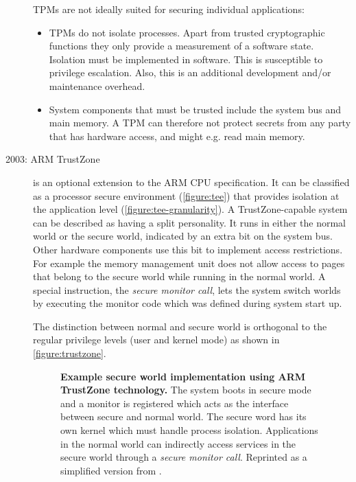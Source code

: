\begin{description}
TPMs are not ideally suited for securing individual applications:\label{ID_1726205291}
\begin{itemize}\label{ID_1105301170}
\item TPMs do not isolate processes. Apart from trusted cryptographic functions they only provide a measurement of a software state. Isolation must be implemented in software. This is susceptible to privilege escalation. Also, this is an additional development and/or maintenance overhead.\label{ID_1644282989}
\item System components that must be trusted include the system bus and main memory.\cite[]{virgtech:tpm}\label{ID_1065555148}
A TPM can therefore not protect secrets from any party that has hardware access, and might e.g. read main memory.\label{ID_788700023}
\end{itemize}\label{ID_244995283}
\item[2003: ARM TrustZone\footnotemark]\label{ID_1887577967}
\label{ID_1026997187}
is an optional extension to the ARM CPU specification.\label{ID_608180135}
It can be classified as a processor secure environment (\autoref{figure:tee}) that provides isolation at the application level (\autoref{figure:tee-granularity}).\label{ID_1608998276}
A TrustZone-capable system can be described as having a split personality. It runs in either the normal world or the secure world, indicated by an extra bit on the system bus.\cite[]{trustzone}\label{ID_1335311105}
Other hardware components use this bit to implement access restrictions. For example the memory management unit does not allow access to pages that belong to the secure world while running in the normal world.\label{ID_472129216}
A special instruction, the \textit{secure monitor call}, lets the system switch worlds by executing the monitor code which was defined during system start up.\label{ID_983944221}

The distinction between normal and secure world is orthogonal to the regular privilege levels (user and kernel mode) as shown in \autoref{figure:trustzone}.\label{ID_1080183818}
\begin{figure}[htbp]
\makebox[\textwidth][c]{
}\caption{\textbf{Example secure world implementation using ARM TrustZone technology.}\label{ID_1321130825}
The system boots in secure mode and a monitor is registered which acts as the interface between secure and normal world. The secure word has its own kernel which must handle process isolation. Applications in the normal world can indirectly access services in the secure world through a \textit{secure monitor call}.\label{ID_1221506439}
Reprinted as a simplified version from \cite{trustzone}.\label{ID_1183892692}
\label{ID_510061380}\label{figure:trustzone}}
\end{figure}



\end{description}
